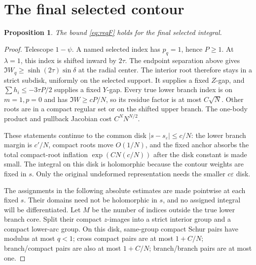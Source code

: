 \documentclass[11pt]{article}
\numberwithin{equation}{section}
\newtheorem{proposition}[theorem]{Proposition}
\theoremstyle{definition}
\newcommand{\eps}{\varepsilon}
\newcommand{\se}{s_\varepsilon}
\begin{document}


\section{The final selected contour}
\label{sec:F}
\begin{proposition}\label{prop:F}
The bound \eqref{eq:reqF} holds for the final selected integral.
\end{proposition}
\begin{proof}
Telescope \(1-\psi\). A named selected index has \(p_q=1\), hence \(P\ge1\).
At \(\lambda=1\), this index is shifted inward by \(2\tau\).
The endpoint separation above gives
\(\Im W_q\ge\sinh(2\tau)\sin\delta\) at the radial center.
The interior root therefore stays in a strict subdisk, uniformly
on the selected support. It supplies a fixed \(Z\)-gap, and
\(\sum h_i\le-3\tau P/2\) supplies a fixed \(Y\)-gap.
Every true lower branch index is on \(m=1,p=0\) and has
\(\Im W\ge cP/N\), so its residue factor is at most \(C\sqrt N\).
Other roots are in a compact regular set or on the shifted upper
branch. The one-body product and pullback Jacobian cost
\(C^N N^{N/2}\).

These statements continue to the common disk \(|s-\se|\le c/N\):
the lower branch margin is \(c'/N\), compact roots move \(O(1/N)\),
and the fixed anchor absorbs the total compact-root inflation
\(\exp(CN(c/N))\) after the disk constant is made small.
The integral on this disk is holomorphic because the contour weights
are fixed in \(s\). Only the original undeformed representation needs
the smaller \(c\eps\) disk.

The assignments in the following absolute estimates are made
pointwise at each fixed \(s\). Their domains need not be holomorphic
in \(s\), and no assigned integral will be differentiated.
Let \(M\) be the number of indices outside the true lower branch core.
Split their compact \(z\)-images into a strict interior group and a
compact lower-arc group. On this disk, same-group compact Schur
pairs have modulus at most \(q<1\); cross compact pairs are at most
\(1+C/N\); branch/compact pairs are also at most \(1+C/N\);
branch/branch pairs are at most one.


\end{proof}
\end{document}

